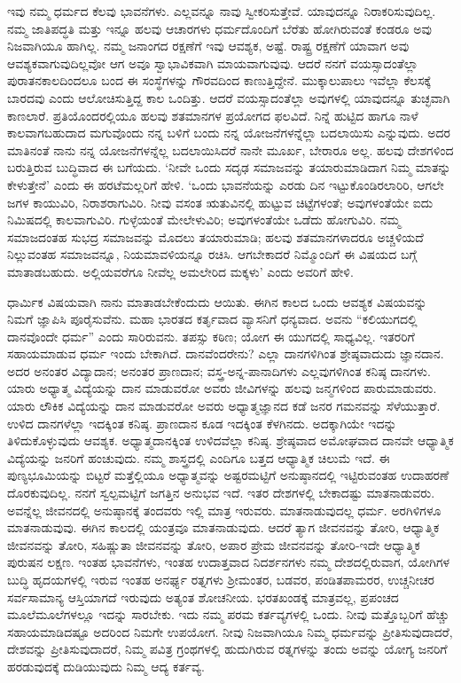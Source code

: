 ಇವು ನಮ್ಮ ಧರ್ಮದ ಕೆಲವು ಭಾವನೆಗಳು. ಎಲ್ಲವನ್ನೂ ನಾವು ಸ್ವೀಕರಿಸುತ್ತೇವೆ. ಯಾವುದನ್ನೂ ನಿರಾಕರಿಸುವುದಿಲ್ಲ. ನಮ್ಮ ಜಾತಿಪದ್ಧತಿ ಮತ್ತು ಇನ್ನೂ ಹಲವು ಆಚಾರಗಳು ಧರ್ಮದೊಂದಿಗೆ ಬೆರೆತು ಹೋಗಿರುವಂತೆ ಕಂಡರೂ ಅವು ನಿಜವಾಗಿಯೂ ಹಾಗಿಲ್ಲ. ನಮ್ಮ ಜನಾಂಗದ ರಕ್ಷಣೆಗೆ ಇವು ಆವಶ್ಯಕ, ಅಷ್ಟೆ. ರಾಷ್ಟ್ರ ರಕ್ಷಣೆಗೆ ಯಾವಾಗ ಅವು ಆವಶ್ಯಕವಾಗುವುದಿಲ್ಲವೋ ಆಗ ಅವೂ ಸ್ವಾಭಾವಿಕವಾಗಿ ಮಾಯವಾಗುವುವು. ಆದರೆ ನನಗೆ ವಯಸ್ಸಾದಂತೆಲ್ಲಾ ಪುರಾತನಕಾಲದಿಂದಲೂ ಬಂದ ಈ ಸಂಸ್ಥೆಗಳನ್ನು ಗೌರವದಿಂದ ಕಾಣುತ್ತಿದ್ದೇನೆ. ಮುಕ್ಕಾಲುಪಾಲು ಇವೆಲ್ಲಾ ಕೆಲಸಕ್ಕೆ ಬಾರದವು ಎಂದು ಆಲೋಚಿಸುತ್ತಿದ್ದ ಕಾಲ ಒಂದಿತ್ತು. ಆದರೆ ವಯಸ್ಸಾದಂತೆಲ್ಲಾ ಅವುಗಳಲ್ಲಿ ಯಾವುದನ್ನೂ ತುಚ್ಛವಾಗಿ ಕಾಣಲಾರೆ. ಪ್ರತಿಯೊಂದರಲ್ಲಿಯೂ ಹಲವು ಶತಮಾನಗಳ ಪ್ರಯೋಗದ ಫಲವಿದೆ. ನಿನ್ನೆ ಹುಟ್ಟಿದ ಹಾಗೂ ನಾಳೆ ಕಾಲವಾಗಬಹುದಾದ ಮಗುವೊಂದು ನನ್ನ ಬಳಿಗೆ ಬಂದು ನನ್ನ ಯೋಜನೆಗಳನ್ನೆಲ್ಲಾ ಬದಲಾಯಿಸು ಎನ್ನುವುದು. ಅದರ ಮಾತಿನಂತೆ ನಾನು ನನ್ನ ಯೋಜನೆಗಳನ್ನೆಲ್ಲ ಬದಲಾಯಿಸಿದರೆ ನಾನೇ ಮೂರ್ಖ, ಬೇರಾರೂ ಅಲ್ಲ. ಹಲವು ದೇಶಗಳಿಂದ ಬರುತ್ತಿರುವ ಬುದ್ಧಿವಾದ ಈ ಬಗೆಯದು. ‘ನೀವೇ ಒಂದು ಸದೃಢ ಸಮಾಜವನ್ನು ತಯಾರುಮಾಡಿದಾಗ ನಿಮ್ಮ ಮಾತನ್ನು ಕೇಳುತ್ತೇನೆ’ ಎಂದು ಈ ಹರಟೆಮಲ್ಲರಿಗೆ ಹೇಳಿ. ‘ಒಂದು ಭಾವನೆಯನ್ನು ಎರಡು ದಿನ ಇಟ್ಟುಕೊಂಡಿರಲಾರಿರಿ, ಆಗಲೇ ಜಗಳ ಕಾಯುವಿರಿ, ನಿರಾಶರಾಗುವಿರಿ. ನೀವು ವಸಂತ ಋತುವಿನಲ್ಲಿ ಹುಟ್ಟುವ ಚಿಟ್ಟೆಗಳಂತೆ; ಅವುಗಳಂತೆಯೇ ಐದು ನಿಮಿಷದಲ್ಲಿ ಕಾಲವಾಗುವಿರಿ. ಗುಳ್ಳೆಯಂತೆ ಮೇಲೇಳುವಿರಿ; ಅವುಗಳಂತೆಯೇ ಒಡೆದು ಹೋಗುವಿರಿ. ನಮ್ಮ ಸಮಾಜದಂತಹ ಸುಭದ್ರ ಸಮಾಜವನ್ನು ಮೊದಲು ತಯಾರುಮಾಡಿ; ಹಲವು ಶತಮಾನಗಳಾದರೂ ಅಚ್ಚಳಿಯದೆ ನಿಲ್ಲುವಂತಹ ಸಮಾಜವನ್ನೂ, ನಿಯಮಾವಳಿಯನ್ನೂ ರಚಿಸಿ. ಆಗಬೇಕಾದರೆ ನಿಮ್ಮೊಂದಿಗೆ ಈ ವಿಷಯದ ಬಗ್ಗೆ ಮಾತಾಡಬಹುದು. ಅಲ್ಲಿಯವರೆಗೂ ನೀವೆಲ್ಲ ಅಮಲೇರಿದ ಮಕ್ಕಳು’ ಎಂದು ಅವರಿಗೆ ಹೇಳಿ.

ಧಾರ್ಮಿಕ ವಿಷಯವಾಗಿ ನಾನು ಮಾತಾಡಬೇಕೆಂದುದು ಆಯಿತು. ಈಗಿನ ಕಾಲದ ಒಂದು ಆವಶ್ಯಕ ವಿಷಯವನ್ನು ನಿಮಗೆ ಜ್ಞಾಪಿಸಿ ಪೂರೈಸುವೆನು. ಮಹಾ ಭಾರತದ ಕರ್ತೃವಾದ ವ್ಯಾಸನಿಗೆ ಧನ್ಯವಾದ. ಅವನು “ಕಲಿಯುಗದಲ್ಲಿ ದಾನವೊಂದೇ ಧರ್ಮ” ಎಂದು ಸಾರಿರುವನು. ತಪಸ್ಸು ಕಠಿಣ; ಯೋಗ ಈ ಯುಗದಲ್ಲಿ ಸಾಧ್ಯವಿಲ್ಲ. ಇತರರಿಗೆ ಸಹಾಯಮಾಡುವ ಧರ್ಮ ಇಂದು ಬೇಕಾಗಿದೆ. ದಾನವೆಂದರೇನು? ಎಲ್ಲಾ ದಾನಗಳಿಗಿಂತ ಶ್ರೇಷ್ಠವಾದುದು ಜ್ಞಾನದಾನ. ಅದರ ಅನಂತರ ವಿದ್ಯಾದಾನ; ಅನಂತರ ಪ್ರಾಣದಾನ; ವಸ್ತ್ರ-ಅನ್ನ-ಪಾನಾದಿಗಳು ಎಲ್ಲವುಗಳಿಗಿಂತ ಕನಿಷ್ಠ ದಾನಗಳು. ಯಾರು ಅಧ್ಯಾತ್ಮ ವಿದ್ಯೆಯನ್ನು ದಾನ ಮಾಡುವರೋ ಅವರು ಜೀವಿಗಳನ್ನು ಹಲವು ಜನ್ಮಗಳಿಂದ ಪಾರುಮಾಡುವರು. ಯಾರು ಲೌಕಿಕ ವಿದ್ಯೆಯನ್ನು ದಾನ ಮಾಡುವರೋ ಅವರು ಅಧ್ಯಾತ್ಮಜ್ಞಾನದ ಕಡೆ ಜನರ ಗಮನವನ್ನು ಸೆಳೆಯುತ್ತಾರೆ. ಉಳಿದ ದಾನಗಳೆಲ್ಲಾ ಇದಕ್ಕಿಂತ ಕನಿಷ್ಠ. ಪ್ರಾಣದಾನ ಕೂಡ ಇದಕ್ಕಿಂತ ಕೆಳಗಿನದು. ಅದಕ್ಕಾಗಿಯೇ ಇದನ್ನು ತಿಳಿದುಕೊಳ್ಳುವುದು ಆವಶ್ಯಕ. ಅಧ್ಯಾತ್ಮದಾನಕ್ಕಿಂತ ಉಳಿದವೆಲ್ಲಾ ಕನಿಷ್ಠ. ಶ್ರೇಷ್ಠವಾದ ಅಮೋಘವಾದ ದಾನವೇ ಆಧ್ಯಾತ್ಮಿಕ ವಿದ್ಯೆಯನ್ನು ಜನರಿಗೆ ಹಂಚುವುದು. ನಮ್ಮ ಶಾಸ್ತ್ರದಲ್ಲಿ ಎಂದಿಗೂ ಬತ್ತದ ಆಧ್ಯಾತ್ಮಿಕ ಚಿಲುಮೆ ಇದೆ. ಈ ಪುಣ್ಯಭೂಮಿಯನ್ನು ಬಿಟ್ಟರೆ ಮತ್ತೆಲ್ಲಿಯೂ ಅಧ್ಯಾತ್ಮವನ್ನು ಅಷ್ಟರಮಟ್ಟಿಗೆ ಅನುಷ್ಠಾನದಲ್ಲಿ ಇಟ್ಟಿರುವಂತಹ ಉದಾಹರಣೆ ದೊರಕುವುದಿಲ್ಲ. ನನಗೆ ಸ್ವಲ್ಪಮಟ್ಟಿಗೆ ಜಗತ್ತಿನ ಅನುಭವ ಇದೆ. ಇತರ ದೇಶಗಳಲ್ಲಿ ಬೇಕಾದಷ್ಟು ಮಾತನಾಡುವರು. ಅವನ್ನೆಲ್ಲ ಜೀವನದಲ್ಲಿ ಅನುಷ್ಠಾನಕ್ಕೆ ತಂದವರು ಇಲ್ಲಿ ಮಾತ್ರ ಇರುವರು. ಮಾತನಾಡುವುದಲ್ಲ ಧರ್ಮ. ಅರಗಿಳಿಗಳೂ ಮಾತನಾಡುವುವು. ಈಗಿನ ಕಾಲದಲ್ಲಿ ಯಂತ್ರವೂ ಮಾತನಾಡುವುದು. ಆದರೆ ತ್ಯಾಗ ಜೀವನವನ್ನು ತೋರಿ, ಆಧ್ಯಾತ್ಮಿಕ ಜೀವನವನ್ನು ತೋರಿ, ಸಹಿಷ್ಣುತಾ ಜೀವನವನ್ನು ತೋರಿ, ಅಪಾರ ಪ್ರೇಮ ಜೀವನವನ್ನು ತೋರಿ-ಇದೇ ಆಧ್ಯಾತ್ಮಿಕ ಪುರುಷನ ಲಕ್ಷಣ. ಇಂತಹ ಭಾವನೆಗಳು, ಇಂತಹ ಉದಾತ್ತವಾದ ನಿದರ್ಶನಗಳು ನಮ್ಮ ದೇಶದಲ್ಲಿರುವಾಗ, ಯೋಗಿಗಳ ಬುದ್ಧಿ ಹೃದಯಗಳಲ್ಲಿ ಇರುವ ಇಂತಹ ಅನರ್ಘ್ಯ ರತ್ನಗಳು ಶ‍್ರೀಮಂತರ, ಬಡವರ, ಪಂಡಿತಪಾಮರರ, ಉಚ್ಚನೀಚರ ಸರ್ವಸಾಮಾನ್ಯ ಆಸ್ತಿಯಾಗದೆ ಇರುವುದು ಅತ್ಯಂತ ಶೋಚನೀಯ. ಭರತಖಂಡಕ್ಕೆ ಮಾತ್ರವಲ್ಲ, ಪ್ರಪಂಚದ ಮೂಲೆಮೂಲೆಗಳಲ್ಲೂ ಇದನ್ನು ಸಾರಬೇಕು. ಇದು ನಮ್ಮ ಪರಮ ಕರ್ತವ್ಯಗಳಲ್ಲಿ ಒಂದು. ನೀವು ಮತ್ತೊಬ್ಬರಿಗೆ ಹೆಚ್ಚು ಸಹಾಯಮಾಡಿದಷ್ಟೂ ಅದರಿಂದ ನಿಮಗೇ ಉಪಯೋಗ. ನೀವು ನಿಜವಾಗಿಯೂ ನಿಮ್ಮ ಧರ್ಮವನ್ನು ಪ್ರೀತಿಸುವುದಾದರೆ, ದೇಶವನ್ನು ಪ್ರೀತಿಸುವುದಾದರೆ, ನಿಮ್ಮ ಪವಿತ್ರ ಗ್ರಂಥಗಳಲ್ಲಿ ಹುದುಗಿರುವ ರತ್ನಗಳನ್ನು ತಂದು ಅವನ್ನು ಯೋಗ್ಯ ಜನರಿಗೆ ಹರಡುವುದಕ್ಕೆ ದುಡಿಯುವುದು ನಿಮ್ಮ ಆದ್ಯ ಕರ್ತವ್ಯ.

